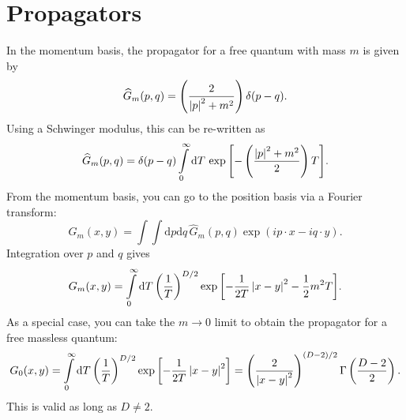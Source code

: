 \section{Propagators}
In the momentum basis, the propagator for a free quantum with mass $m$ is given by
\begin{equation}
	\widehat{G}_{m}(p, q) = \left( \frac{2}{\left\lvert p \right\rvert^{2} + m^2} \right) \delta(p - q).
\end{equation}
Using a Schwinger modulus, this can be re-written as
\begin{equation}
	\widehat{G}_{m}(p, q) = \delta(p - q) \int\limits_{0}^{\infty} \mathrm{d}T \, \exp{\left[- \left( \frac{\left\lvert p \right\rvert^2 + m^2}{2} \right) T\right]}.
\end{equation}
From the momentum basis, you can go to the position basis via a Fourier transform:
\begin{equation}
	G_{m}(x, y) = \int \int \mathrm{d}p \mathrm{d}q \, \widehat{G}_{m}(p, q) \exp{(i p \cdot x - i q \cdot y)}.
\end{equation}
Integration over $p$ and $q$ gives
\begin{equation}
	G_{m}(x, y) = \int\limits_{0}^{\infty} \mathrm{d}T \left( \frac{1}{T} \right)^{D/2} \exp{\left[- \frac{1}{2T}\left\lvert x - y \right\rvert^{2} - \frac{1}{2} m^{2}T \right]}.
\end{equation}
As a special case, you can take the $m \rightarrow 0$ limit to obtain the propagator for a free massless quantum:
\begin{equation}
	G_{0}(x, y) = \int\limits_{0}^{\infty} \mathrm{d}T \left( \frac{1}{T} \right)^{D/2} \exp{\left[- \frac{1}{2T}\left\lvert x - y \right\rvert^{2} \right]} = \left( \frac{2}{\left\lvert x - y \right\rvert^{2}} \right)^{(D-2)/2} \Gamma\left( \frac{D - 2}{2} \right).
\end{equation}
This is valid as long as $D \neq 2$.
